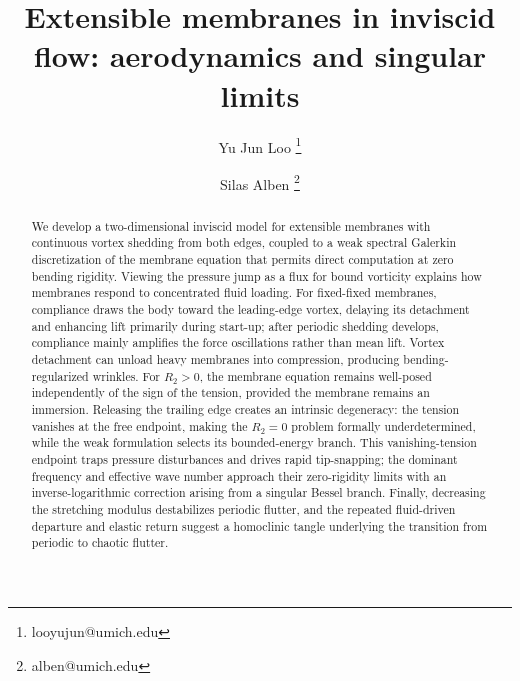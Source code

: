 \documentclass{article}[12pt]
\title{Extensible membranes in inviscid flow: aerodynamics and singular limits}
\author[1]{Yu Jun Loo \thanks{looyujun@umich.edu}}
\author[1]{Silas Alben \thanks{alben@umich.edu}}
\affil[1]{Department of Mathematics, University of Michigan, Ann Arbor, MI 48109, USA}
\date{}
\theoremstyle{Theorem}
\begin{document}
\maketitle
\begin{abstract}
We develop a two-dimensional inviscid model for extensible membranes with continuous vortex shedding from both edges, coupled to a weak spectral Galerkin discretization of the membrane equation that permits direct computation at zero bending rigidity. Viewing the pressure jump as a flux for bound vorticity explains how membranes respond to concentrated fluid loading. For fixed-fixed membranes, compliance draws the body toward the leading-edge vortex, delaying its detachment and enhancing lift primarily during start-up; after periodic shedding develops, compliance mainly amplifies the force oscillations rather than mean lift. Vortex detachment can unload heavy membranes into compression, producing bending-regularized wrinkles. For $R_2>0$, the membrane equation remains well-posed independently of the sign of the tension, provided the membrane remains an immersion. Releasing the trailing edge creates an intrinsic degeneracy: the tension vanishes at the free endpoint, making the $R_2=0$ problem formally underdetermined, while the weak formulation selects its bounded-energy branch. This vanishing-tension endpoint traps pressure disturbances and drives rapid tip-snapping; the dominant frequency and effective wave number approach their zero-rigidity limits with an inverse-logarithmic correction arising from a singular Bessel branch. Finally, decreasing the stretching modulus destabilizes periodic flutter, and the repeated fluid-driven departure and elastic return suggest a homoclinic tangle underlying the transition from periodic to chaotic flutter.


\end{abstract}
\end{document}
